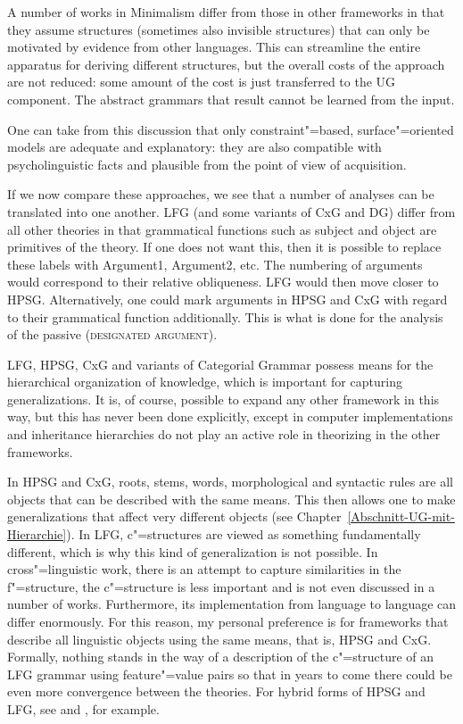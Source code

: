 A number of works in Minimalism differ from those in other frameworks in that they assume structures (sometimes also invisible structures) that can only be motivated
by evidence from other languages. This can streamline the entire apparatus for deriving
different structures, but the overall costs of the approach are not reduced: some amount of the
cost is just transferred to the UG component. The abstract grammars that result cannot be learned from the input.

One can take from this discussion that only constraint"=based, surface"=oriented models are adequate
and explanatory: they are also compatible with psycholinguistic facts and plausible from the point of view of acquisition.

If we now compare these approaches, we see that a number of analyses can be translated into one
another. LFG (and some variants of CxG and DG) differ from all other theories in that grammatical
functions such as subject and object are primitives of the theory. If one does not want this, then it is possible to replace these labels with Argument1, Argument2,
etc. The numbering of arguments would correspond to their relative obliqueness. LFG would then move
closer to HPSG. Alternatively, one could mark arguments in HPSG and CxG with regard to their grammatical function additionally. This is what is done for the analysis of the passive (\textsc{designated argument}).

LFG, HPSG, CxG and variants of Categorial Grammar \citep{MCKRZ89a-u,Briscoe2000a,Villavicencio2002a}
possess means for the hierarchical organization of knowledge, which is important for capturing generalizations.
It is, of course, possible to expand any other framework in this way, but this has never been done
explicitly, except in computer implementations and inheritance hierarchies do not play an active role in theorizing in the other frameworks.

In HPSG and CxG, roots, stems, words, morphological and syntactic rules are all objects that can be
described with the same means. This then allows one to make generalizations that affect very
different objects (see Chapter~\ref{Abschnitt-UG-mit-Hierarchie}).   
In LFG, c"=structures are viewed as something fundamentally different, which is why this kind of generalization is not possible. In cross"=linguistic
work, there is an attempt to capture similarities in the f"=structure, the c"=structure is less important and is not even discussed in a number of
works. Furthermore, its implementation from language to language can differ enormously. For this reason, my personal preference is for frameworks
that describe all linguistic objects using the same means, that is, HPSG and CxG. Formally, nothing stands in the way of a description of the c"=structure
of an LFG grammar using feature"=value pairs so that in years to come there could be even more
convergence between the theories. For hybrid forms of HPSG and LFG, see  and , for example.

